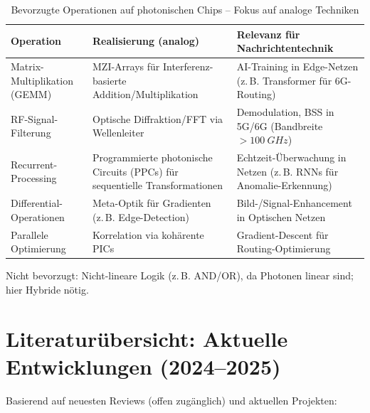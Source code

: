 	\begin{table}[htbp]
		\centering
		\begin{tabular}{p{3cm} p{5cm} p{6cm}}
			\toprule
			\textbf{Operation} & \textbf{Realisierung (analog)} & \textbf{Relevanz für Nachrichtentechnik} \\
			\midrule
			Matrix-Multiplikation (GEMM) & MZI-Arrays für Interferenz-basierte Addition/Multiplikation & AI-Training in Edge-Netzen (z.\,B. Transformer für 6G-Routing) \cite{photonics_ai} \\
			RF-Signal-Filterung & Optische Diffraktion/FFT via Wellenleiter & Demodulation, BSS in 5G/6G (Bandbreite $>\SI{100}{GHz}$) \cite{rf_photonics} \\
			Recurrent-Processing & Programmierte photonische Circuits (PPCs) für sequentielle Transformationen & Echtzeit-Überwachung in Netzen (z.\,B. RNNs für Anomalie-Erkennung) \cite{recurrent_photonics} \\
			Differential-Operationen & Meta-Optik für Gradienten (z.\,B. Edge-Detection) & Bild-/Signal-Enhancement in Optischen Netzen \cite{differential_optical} \\
			Parallele Optimierung & Korrelation via kohärente PICs & Gradient-Descent für Routing-Optimierung \cite{optical_advantages} \\
			\bottomrule
		\end{tabular}
		\caption{Bevorzugte Operationen auf photonischen Chips – Fokus auf analoge Techniken}
		\label{tab:operations}
	\end{table}
	
	Nicht bevorzugt: Nicht-lineare Logik (z.\,B. AND/OR), da Photonen linear sind; hier Hybride nötig.
	
	\section{Literaturübersicht: Aktuelle Entwicklungen (2024–2025)}
	
	Basierend auf neuesten Reviews (offen zugänglich) und aktuellen Projekten:
	

